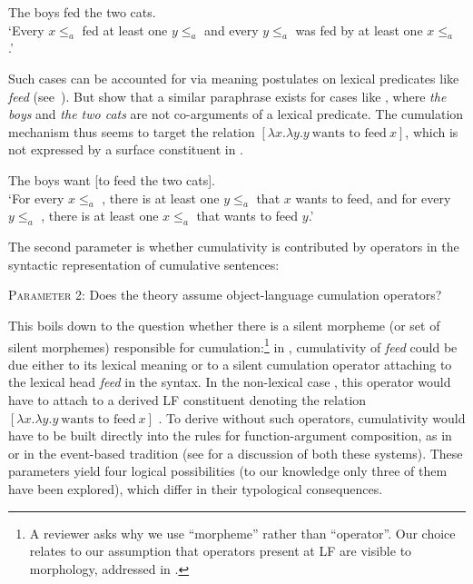 \documentclass[output=paper]{langscibook}
\begin{document}
 \ea\label{has-sch:4a} The boys fed the two cats. \\
`Every $x \leq_a$  fed at least one $y \leq_a$  and every $y \leq_a$  was fed by at least one $x \leq_a$ .'
\z
 
\noindent Such cases can be accounted for via meaning postulates on lexical predicates like \textit{feed} (see~\citealt{Scha:1981, Krifka:1986}). But \citet{Beck:2000a} show that a similar paraphrase exists for cases like , where \textit{the boys} and \textit{the two cats} are not co-arguments of a lexical predicate. The cumulation mechanism thus seems to target the relation $[\lambda x.\lambda y.y\ \text{wants to feed}\ x]$, which is not expressed by a surface constituent in .

\ea\label{has-sch:4b} The boys want [to feed the two cats]. \\
`For every $x \leq_a$ , there is at least one $y \leq_a$  that $x$ wants to feed, and for every $y \leq_a$ , there is at least one $x \leq_a$  that wants to feed $y$.'
\z

\noindent The second parameter is whether cumulativity is contributed by operators in the syntactic representation of cumulative sentences:

\ea\label{has-sch:par2} \textsc{Parameter 2:} Does the theory assume object-language cumulation operators? \z

\noindent This boils down to the question whether there is a silent morpheme (or set of silent morphemes) responsible for cumulation:\footnote{A reviewer asks why we use ``morpheme'' rather than ``operator''. Our choice relates to our assumption that operators present at LF are visible to morphology, addressed in .} in , cumulativity of \textit{feed} could be due either to its lexical meaning or to a silent cumulation operator attaching to the lexical head \textit{feed} in the syntax. In the non-lexical case , this operator would have to attach to a derived LF constituent denoting the relation $[\lambda x.\lambda y.y\ \text{wants to feed}\ x]$ \citep{Beck:2000a}. To derive  without such operators, cumulativity would have to be built directly into the rules for function-argument composition, as in \citet{Schmitt:2019} or in the event-based tradition (see  for a discussion of both these systems). These parameters yield four logical possibilities (to our knowledge only three of them have been explored), which differ in their typological consequences.
\end{document}
